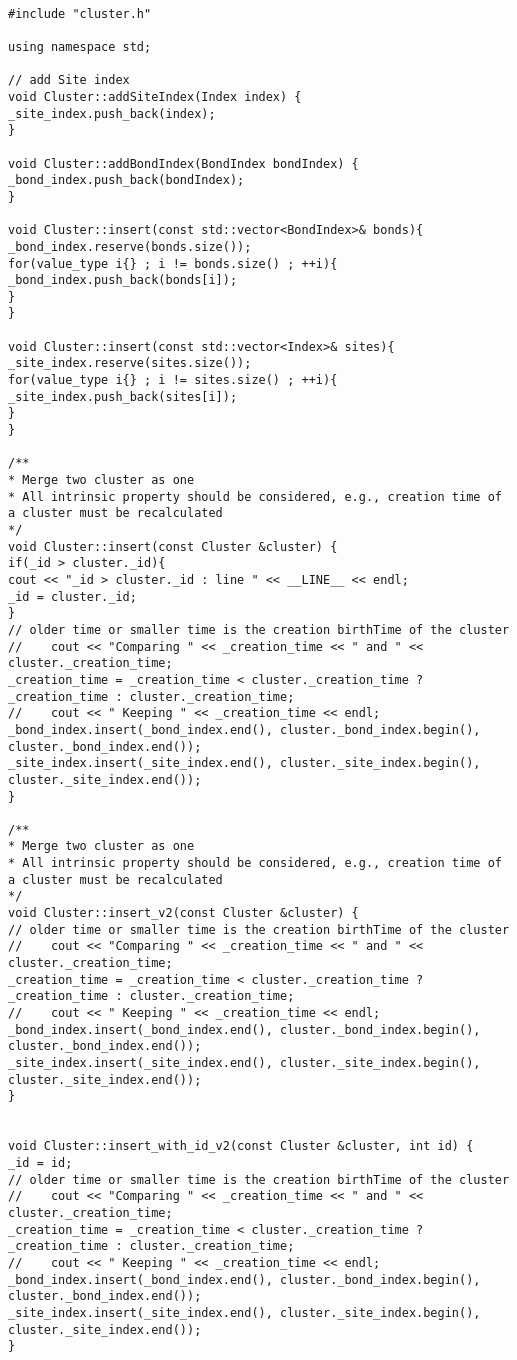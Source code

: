 \begin{lstlisting}[style=CStyle]

#include "cluster.h"

using namespace std;

// add Site index
void Cluster::addSiteIndex(Index index) {
_site_index.push_back(index);
}

void Cluster::addBondIndex(BondIndex bondIndex) {
_bond_index.push_back(bondIndex);
}

void Cluster::insert(const std::vector<BondIndex>& bonds){
_bond_index.reserve(bonds.size());
for(value_type i{} ; i != bonds.size() ; ++i){
_bond_index.push_back(bonds[i]);
}
}

void Cluster::insert(const std::vector<Index>& sites){
_site_index.reserve(sites.size());
for(value_type i{} ; i != sites.size() ; ++i){
_site_index.push_back(sites[i]);
}
}

/**
* Merge two cluster as one
* All intrinsic property should be considered, e.g., creation time of a cluster must be recalculated
*/
void Cluster::insert(const Cluster &cluster) {
if(_id > cluster._id){
cout << "_id > cluster._id : line " << __LINE__ << endl;
_id = cluster._id;
}
// older time or smaller time is the creation birthTime of the cluster
//    cout << "Comparing " << _creation_time << " and " << cluster._creation_time;
_creation_time = _creation_time < cluster._creation_time ? _creation_time : cluster._creation_time;
//    cout << " Keeping " << _creation_time << endl;
_bond_index.insert(_bond_index.end(), cluster._bond_index.begin(), cluster._bond_index.end());
_site_index.insert(_site_index.end(), cluster._site_index.begin(), cluster._site_index.end());
}

/**
* Merge two cluster as one
* All intrinsic property should be considered, e.g., creation time of a cluster must be recalculated
*/
void Cluster::insert_v2(const Cluster &cluster) {
// older time or smaller time is the creation birthTime of the cluster
//    cout << "Comparing " << _creation_time << " and " << cluster._creation_time;
_creation_time = _creation_time < cluster._creation_time ? _creation_time : cluster._creation_time;
//    cout << " Keeping " << _creation_time << endl;
_bond_index.insert(_bond_index.end(), cluster._bond_index.begin(), cluster._bond_index.end());
_site_index.insert(_site_index.end(), cluster._site_index.begin(), cluster._site_index.end());
}


void Cluster::insert_with_id_v2(const Cluster &cluster, int id) {
_id = id;
// older time or smaller time is the creation birthTime of the cluster
//    cout << "Comparing " << _creation_time << " and " << cluster._creation_time;
_creation_time = _creation_time < cluster._creation_time ? _creation_time : cluster._creation_time;
//    cout << " Keeping " << _creation_time << endl;
_bond_index.insert(_bond_index.end(), cluster._bond_index.begin(), cluster._bond_index.end());
_site_index.insert(_site_index.end(), cluster._site_index.begin(), cluster._site_index.end());
}



\end{lstlisting}

